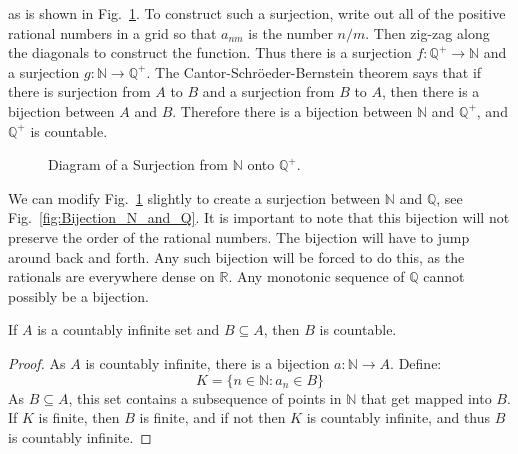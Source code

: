        as is shown in Fig.~\ref{fig:Bijection_N_and_Q_Plus}.
        To construct such a surjection, write out all of the
        positive rational numbers in a grid so that $a_{nm}$
        is the number $n/m$. Then zig-zag along the diagonals
        to construct the function. Thus there is a surjection
        $f:\mathbb{Q}^{+}\rightarrow\mathbb{N}$ and a surjection
        $g:\mathbb{N}\rightarrow\mathbb{Q}^{+}$. The
        Cantor-Schr\"{o}eder-Bernstein theorem says that if there is
        surjection from $A$ to $B$ and a surjection from $B$ to $A$, then
        there is a bijection between $A$ and $B$. Therefore there is a
        bijection between $\mathbb{N}$ and $\mathbb{Q}^{+}$, and
        $\mathbb{Q}^{+}$ is countable.
        \begin{figure}[H]
            \centering
            \captionsetup{type=figure}
            \resizebox{0.7\textwidth}{!}{%
                
            }
            \caption{Diagram of a Surjection from
                     $\mathbb{N}$ onto $\mathbb{Q}^{+}$.}
            \label{fig:Bijection_N_and_Q_Plus}
        \end{figure}
        We can modify Fig.~\ref{fig:Bijection_N_and_Q_Plus}
        slightly to create a surjection between $\mathbb{N}$
        and $\mathbb{Q}$, see
        Fig.~\ref{fig:Bijection_N_and_Q}.
        It is important to note that this bijection will not
        preserve the order of the rational numbers. The
        bijection will have to jump around back and forth.
        Any such bijection will be forced to do this, as the
        rationals are everywhere dense on $\mathbb{R}$. Any
        monotonic sequence of $\mathbb{Q}$ cannot possibly
        be a bijection.
        \begin{theorem}
            If $A$ is a countably infinite set and
            $B\subseteq{A}$, then $B$ is countable.
        \end{theorem}
        \begin{proof}
            As $A$ is countably infinite, there is a bijection
            $a:\mathbb{N}\rightarrow{A}$. Define:
            \begin{equation}
                K=\{n\in\mathbb{N}:a_{n}\in{B}\}
            \end{equation}
            As $B\subseteq{A}$,
            this set contains a subsequence of points in
            $\mathbb{N}$ that get mapped into $B$. If $K$ is finite,
            then $B$ is finite, and if not then $K$ is countably
            infinite, and thus $B$ is countably infinite.
        \end{proof}

